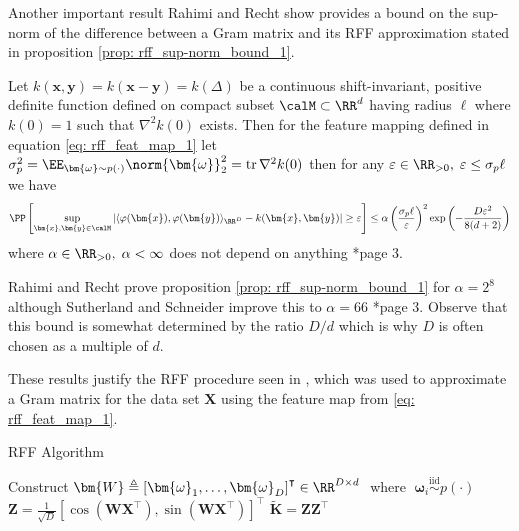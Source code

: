Another important result Rahimi and Recht show provides a bound on the sup-norm of the difference between a Gram matrix and its RFF approximation stated in proposition \ref{prop: rff_sup-norm_bound_1}.

\begin{prop} \label{prop: rff_sup-norm_bound_1}
    Let $k(\bm{x} , \bm{y}) = k(\bm{x} - \bm{y}) = k( \Delta)$ be a continuous shift-invariant, positive definite function defined on compact subset $\calM \subset \RR^d$ having radius $\ell$ where $k(0) = 1$ such that $\nabla^2 k(0)$ exists. Then for the feature mapping defined in equation \ref{eq: rff_feat_map_1} let $\sigma_p^2 = \EE_{\bm{\omega} \sim p(\cdot)} \norm{\bm{\omega}}^2_2 = \operatorname{tr} \nabla^2 k(0)$ then for any $\varepsilon \in \RR_{>0}, \; \varepsilon \leq \sigma_p \ell$ we have
    \[
        \PP \left[ \sup_{\bm{x},\bm{y} \in \calM} \left| \langle \varphi (\bm{x}) , \varphi (\bm{y}) \rangle_{\RR^D} - k (\bm{x},\bm{y}) \right| \geq \varepsilon \right] \leq \alpha \left( \frac{\sigma_p \ell}{\varepsilon} \right)^2 \exp \left( - \frac{D \varepsilon^2}{8(d+2)} \right)
    \]
    where $\alpha \in \RR_{>0}, \; \alpha < \infty$ does not depend on anything \cite{NIPS2007_013a006f}*{page 3}.
\end{prop}

Rahimi and Recht prove proposition \ref{prop: rff_sup-norm_bound_1} for $\alpha = 2^8$ although Sutherland and Schneider improve this to $\alpha = 66$ \cite{sutherland2015error}*{page 3}. Observe that this bound is somewhat determined by the ratio $D/d$ which is why $D$ is often chosen as a multiple of $d$.

These results justify the RFF procedure seen in , which was used to approximate a Gram matrix for the data set $\bm{X}$ using the feature map from \ref{eq: rff_feat_map_1}.

{\centering
\begin{minipage}{.85\linewidth}
    \begin{algorithm}[H]
        \caption{RFF Algorithm}
        \label{alg: RFF-algorithm}
        \SetAlgoLined
        \DontPrintSemicolon

        \BlankLine
        Construct $\bm{W} \triangleq \left[ \bm{\omega}_1 ,\ldots , \bm{\omega}_D \right]^{\intercal} \in \RR^{D \times d} \;$ where $\; \bm{\omega}_i \stackrel{\text{iid}}{\sim} p(\cdot)$\;
        $\bm{Z} = \frac{1}{\sqrt{D}} \left[ \cos \left( \bm{W} \bm{X}^{\intercal} \right), \sin \left( \bm{W} \bm{X}^{\intercal} \right) \right]^{\intercal}$\;
        $\bm{\widetilde{K}} = \bm{Z}\bm{Z}^{\intercal}$\;
        \BlankLine
    \end{algorithm}
\end{minipage}
\par
}

